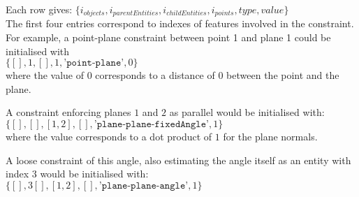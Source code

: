 Each row gives:
$\{i_{objects},i_{parentEntities},i_{childEntities},i_{points},type,value\}$\\
The first four entries correspond to indexes of features involved in the constraint.
For example, a point-plane constraint between point 1 and plane 1 could be initialised with\\
$\{[],1,[],1,\texttt{'point-plane'},0\}$ \\
where the value of $0$ corresponds to a distance of $0$ between the point and the plane.

A constraint enforcing planes $1$ and $2$ as parallel would be initialised with:\\
$\{[],[],[1,2],[],\texttt{'plane-plane-fixedAngle'},1\}$\\
where the value corresponds to a dot product of $1$ for the plane normals.

A loose constraint of this angle, also estimating the angle itself as an entity with index $3$ would be initialised with:\\
$\{[],3[],[1,2],[],\texttt{'plane-plane-angle'},1\}$
